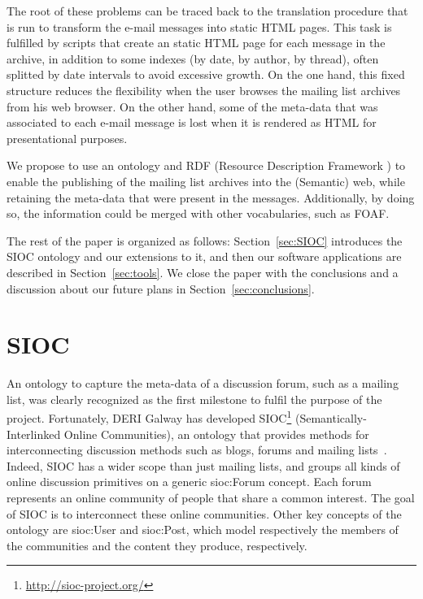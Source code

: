 \documentclass{llncs}
\begin{document}
The root of these problems can be traced back to the translation
procedure that is run to transform the e-mail messages into static
HTML pages. This task is fulfilled by scripts that create an
static HTML page for each message in the archive, in addition to
some indexes (by date, by author, by thread), often splitted by
date intervals to avoid excessive growth. On the one hand, this 
fixed structure reduces the flexibility when the user browses the
mailing list archives from his web browser. On the other hand, some 
of the meta-data that was associated to each e-mail message is lost
when it is rendered as HTML for presentational purposes.

We propose to use an ontology and RDF (Resource Description Framework
\cite{RDF}) to enable the publishing of the mailing list archives into 
the (Semantic) web, while retaining the meta-data that were present in 
the messages. Additionally, by doing so, the information could be
merged with other vocabularies, such as FOAF.

The rest of the paper is organized as follows: 
Section~\ref{sec:SIOC} introduces the SIOC ontology and our extensions 
to it, and then our software applications are described in 
Section~\ref{sec:tools}. We close the paper with the conclusions and 
a discussion about our future plans in Section~\ref{sec:conclusions}.

\section{\label{sec:SIOC}SIOC}

An ontology to capture the meta-data of a discussion forum, such as
a mailing list, was clearly recognized as the first milestone to
fulfil the purpose of the project. Fortunately, DERI Galway has 
developed SIOC\footnote{\url{http://sioc-project.org/}} (Semantically-Interlinked 
Online Communities), an ontology that provides methods for interconnecting 
discussion methods such as blogs, forums and mailing 
lists~\cite{Breslin2006}\cite{Breslin2005}. Indeed, SIOC has a wider 
scope than just mailing lists, and groups all kinds of online discussion 
primitives on a generic \textsf{sioc:Forum} concept. Each forum represents 
an online community of people that share a common interest. The goal 
of SIOC is to interconnect these online communities. Other key concepts 
of the ontology are \textsf{sioc:User} and \textsf{sioc:Post}, which 
model respectively the members of the communities and the content they 
produce, respectively.
\end{document}
